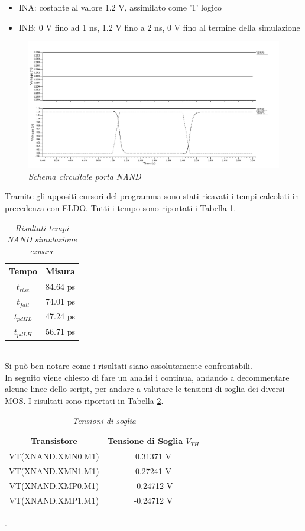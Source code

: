 \begin{itemize}
	\item INA: costante al valore 1.2 V, assimilato come '1' logico
	\item INB: 0 V fino ad 1 ns, 1.2 V fino a 2 ns, 0 V fino al termine della simulazione
\end{itemize}
\begin{figure}[!htb]
	\centering
	\includegraphics[scale=0.35]{immagini/onde_5_1}
	\caption{\textit{Schema circuitale porta NAND}}
	\label{onde_5_1}
\end{figure}
Tramite gli appositi cursori del programma sono stati ricavati i tempi calcolati in precedenza con ELDO. Tutti i tempo sono riportati i Tabella \ref{Tab5_2}. 
\begin{table}[!h]\footnotesize
	\centering
	\begin{tabular}{|c|c|}
		\hline
		\textbf{Tempo} & \textbf{Misura}\\
		\hline
		$t_{rise}$ & 84.64 ps\\
		$t_{fall}$ & 74.01 ps\\
		$t_{pdHL}$ & 47.24 ps\\
		$t_{pdLH}$ & 56.71 ps\\
		\hline
	\end{tabular}
	\caption{\textit{Risultati tempi NAND simulazione ezwave}}
	\label{Tab5_2}
\end{table}
\\
Si può ben notare come i risultati siano assolutamente confrontabili.\\
In seguito viene chiesto di fare un analisi i continua, andando a decommentare alcune linee dello script, per andare a valutare le tensioni di soglia dei diversi MOS. I risultati sono riportati in Tabella \ref{Tab5_3}. 
\begin{table}[!h]\footnotesize
	\centering
	\begin{tabular}{|c|c|}
		\hline
		\textbf{Transistore} & \textbf{Tensione di Soglia $V_{TH}$}\\
		\hline
		VT(XNAND.XMN0.M1) & 0.31371 V\\
		VT(XNAND.XMN1.M1) & 0.27241 V\\
		VT(XNAND.XMP0.M1) & -0.24712 V\\
		VT(XNAND.XMP1.M1) & -0.24712 V\\
		\hline
	\end{tabular}
	\caption{\textit{Tensioni di soglia}}
	\label{Tab5_3}
\end{table}.
